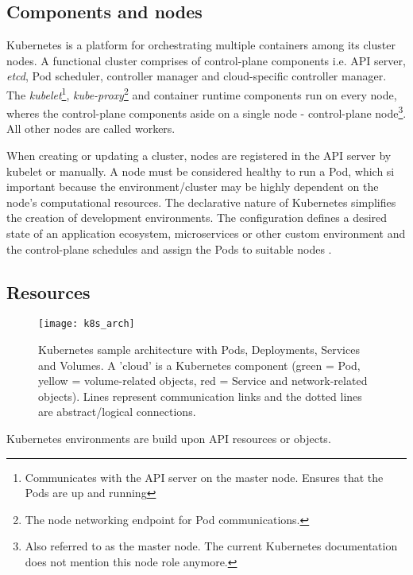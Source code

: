 \subsection{Components and nodes \label{anal:k8s:nodes}}
Kubernetes is a platform for orchestrating multiple containers among its cluster nodes. A functional cluster comprises of control-plane components i.e. API server, \textit{etcd}, Pod scheduler, controller manager and cloud-specific controller manager. The \textit{kubelet}\footnote{Communicates with the API server on the master node. Ensures that the Pods are up and running}, \textit{kube-proxy}\footnote{The node networking endpoint for Pod communications.} and container runtime components run on every node, wheres the control-plane components aside on a single node - control-plane node\footnote{Also referred to as the master node. The current Kubernetes documentation does not mention this node role anymore.}. All other nodes are called workers.

When creating or updating a cluster, nodes are registered in the API server by kubelet or manually. A node must be considered healthy to run a Pod, which si important because the environment/cluster may be highly dependent on the node's computational resources. The declarative nature of Kubernetes simplifies the creation of development environments. The configuration defines a desired state of an application ecosystem, microservices or other custom environment and the control-plane schedules and assign the Pods to suitable nodes \cite{video:k8s:principals}. 

\subsection{Resources \label{anal:k8s:resources}}
\begin{figure}[h]
	\centering
	\texttt{[image: k8s\_arch]}
	\caption{Kubernetes sample architecture with Pods, Deployments, Services and Volumes. A 'cloud' is a Kubernetes component (green = Pod, yellow = volume-related objects, red = Service and network-related objects). Lines represent communication links and the dotted lines are abstract/logical connections.}
	\label{image:anal:k8s:arch}
\end{figure}

Kubernetes environments are build upon API resources or objects.

